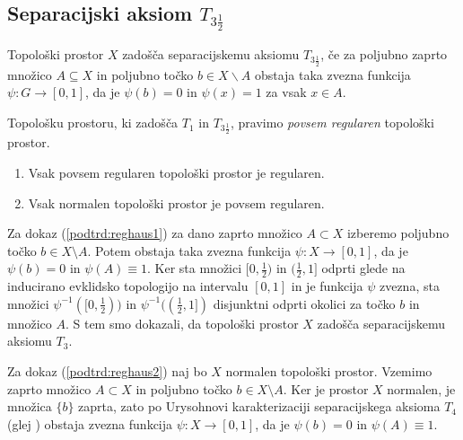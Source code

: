 \documentclass[mat1]{fmfdelo}
\begin{document}
\subsection{Separacijski aksiom $T_{3 \frac{1}{2}}$}

\begin{definicija}
	Topološki prostor $X$ zadošča separacijskemu aksiomu $T_{3 \frac{1}{2}}$, če za poljubno zaprto množico $A \subseteq X$ in poljubno točko $b \in X\backslash A$ obstaja taka zvezna funkcija $\psi\colon G \to [0, 1]$, da je $\psi (b) = 0$ in $\psi (x) = 1$ za vsak $x \in A$.
\end{definicija}

\begin{definicija}
	Topološku prostoru, ki zadošča $T_1$ in $T_{3 \frac{1}{2}}$, pravimo \emph{povsem regularen} topološki prostor.
\end{definicija}


\begin{trditev}\label{pos:reghaus}
\begin{enumerate}
\item Vsak povsem regularen topološki prostor je regularen.\label{podtrd:reghaus1}
\item Vsak normalen topološki prostor je povsem regularen.\label{podtrd:reghaus2}
\end{enumerate}
\end{trditev}

\begin{dokaz}
Za dokaz (\ref{podtrd:reghaus1}) za dano zaprto množico $A \subset X$ izberemo poljubno točko $b \in X \setminus A$. Potem obstaja taka zvezna funkcija $\psi\colon X \to [0, 1]$, da je $\psi(b) = 0$ in $\psi(A) \equiv 1$.
Ker sta množici $[0, \frac{1}{2})$ in $(\frac{1}{2}, 1]$ odprti glede na inducirano evklidsko topologijo na intervalu $[0, 1]$ in je funkcija $\psi$ zvezna, sta množici $\psi^{-1}([0, \frac{1}{2}))$ in $\psi^{-1}((\frac{1}{2}, 1])$ disjunktni odprti okolici za točko $b$ in množico $A$.
S tem smo dokazali, da topološki prostor $X$ zadošča separacijskemu aksiomu $T_3$.

Za dokaz (\ref{podtrd:reghaus2}) naj bo $X$ normalen topološki prostor. 
Vzemimo zaprto množico $A \subset X$ in poljubno točko $b \in X \setminus A$.
Ker je prostor $X$ normalen, je množica $\lbrace b \rbrace$ zaprta,
zato po Urysohnovi karakterizaciji separacijskega aksioma $T_4$ (glej \cite{bib:top}) obstaja zvezna funkcija $\psi\colon X \to [0, 1]$, da je $\psi(b) = 0 $ in $\psi(A) \equiv 1$.
\end{dokaz}
\end{document}
